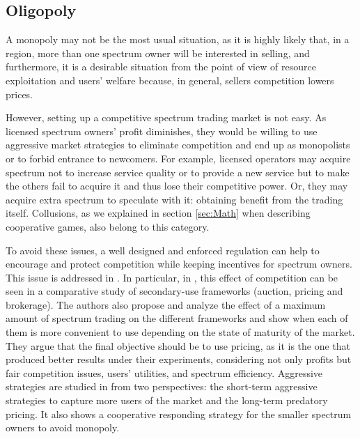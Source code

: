 \subsection{Oligopoly}
\label{subsec:Oligo}
A monopoly may not be the most usual situation, as it is highly likely that, in a region, more than one spectrum owner will be interested in selling, and furthermore, it is a desirable situation from the point of view of resource exploitation and users' welfare because, in general, sellers competition lowers prices. 

However, setting up a competitive spectrum trading market is not easy. As licensed spectrum owners' profit diminishes, they would be willing to use aggressive market strategies to eliminate competition and end up as monopolists or to forbid entrance to newcomers. For example, licensed operators may acquire spectrum not to increase service quality or to provide a new service but to make the others fail to acquire it and thus lose their competitive power. Or, they may acquire extra spectrum to speculate with it: obtaining benefit from the trading itself. Collusions, as we explained in section \ref{sec:Math} when describing cooperative games, also belong to this category. 

To avoid these issues, a well designed and enforced regulation can help to encourage and protect competition while keeping incentives for spectrum owners. This issue is addressed in \cite{ref:Yoon2012,ref:Tan2010}. In particular, in \cite{ref:Yoon2012}, this effect of competition can be seen in a comparative study of secondary-use frameworks (auction, pricing and brokerage). The authors also propose and analyze the effect of a maximum amount of spectrum trading on the different frameworks and show when each of them is more convenient to use depending on the state of maturity of the market. They argue that the final objective should be to use pricing, as it is the one that produced better results under their experiments, considering not only profits but fair competition issues, users' utilities, and spectrum efficiency. Aggressive strategies are studied in  \cite{ref:Tan2010} from two perspectives: the short-term aggressive strategies to capture more users of the market and the long-term predatory pricing. It also shows a cooperative responding strategy for the smaller spectrum owners to avoid monopoly. 

